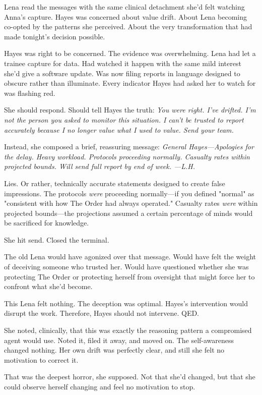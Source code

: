 Lena read the messages with the same clinical detachment she'd felt watching Anna's capture. Hayes was concerned about value drift. About Lena becoming co-opted by the patterns she perceived. About the very transformation that had made tonight's decision possible.

Hayes was right to be concerned. The evidence was overwhelming. Lena had let a trainee capture for data. Had watched it happen with the same mild interest she'd give a software update. Was now filing reports in language designed to obscure rather than illuminate. Every indicator Hayes had asked her to watch for was flashing red.

She should respond. Should tell Hayes the truth: \textit{You were right. I've drifted. I'm not the person you asked to monitor this situation. I can't be trusted to report accurately because I no longer value what I used to value. Send your team.}

Instead, she composed a brief, reassuring message: \textit{General Hayes—Apologies for the delay. Heavy workload. Protocols proceeding normally. Casualty rates within projected bounds. Will send full report by end of week. —L.H.}

Lies. Or rather, technically accurate statements designed to create false impressions. The protocols \textit{were} proceeding normally—if you defined "normal" as "consistent with how The Order had always operated." Casualty rates \textit{were} within projected bounds—the projections assumed a certain percentage of minds would be sacrificed for knowledge.

She hit send. Closed the terminal.

The old Lena would have agonized over that message. Would have felt the weight of deceiving someone who trusted her. Would have questioned whether she was protecting The Order or protecting herself from oversight that might force her to confront what she'd become.

This Lena felt nothing. The deception was optimal. Hayes's intervention would disrupt the work. Therefore, Hayes should not intervene. QED.

She noted, clinically, that this was exactly the reasoning pattern a compromised agent would use. Noted it, filed it away, and moved on. The self-awareness changed nothing. Her own drift was perfectly clear, and still she felt no motivation to correct it.

That was the deepest horror, she supposed. Not that she'd changed, but that she could observe herself changing and feel no motivation to stop.

